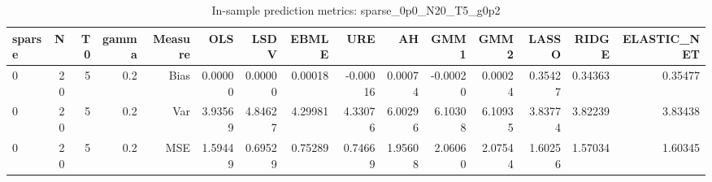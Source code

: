 \begin{table}[!htbp]\centering
\caption{In-sample prediction metrics: sparse_0p0_N20_T5_g0p2}
\label{tab:table2_sparse_0p0_N20_T5_g0p2}
\begin{tabular}{lrrrrrrrrrrrrrr}
\hline
sparse & N & T0 & gamma & Measure & OLS & LSDV & EBMLE & URE & AH & GMM1 & GMM2 & LASSO & RIDGE & ELASTIC_NET \\
\hline
0 & 20 & 5 & 0.2 & Bias & 0.00000 & 0.00000 & 0.00018 & -0.00016 & 0.00074 & -0.00020 & 0.00024 & 0.35427 & 0.34363 & 0.35477 \\
0 & 20 & 5 & 0.2 & Var & 3.93569 & 4.84627 & 4.29981 & 4.33076 & 6.00296 & 6.10308 & 6.10935 & 3.83774 & 3.82239 & 3.83438 \\
0 & 20 & 5 & 0.2 & MSE & 1.59449 & 0.69529 & 0.75289 & 0.74669 & 1.95608 & 2.06060 & 2.07544 & 1.60256 & 1.57034 & 1.60345 \\
\hline
\end{tabular}
\end{table}

